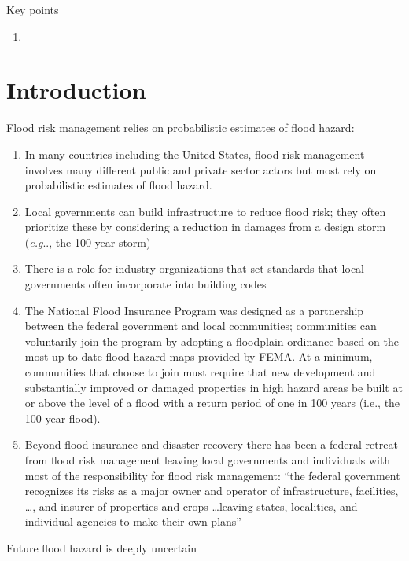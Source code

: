 \documentclass[11pt]{article}
\makeatletter
\DeclareRobustCommand\onedot{\futurelet\@let@token\@onedot}
\def\@onedot{\ifx\@let@token.\else.\null\fi\xspace}
\def\eg{\emph{e.g}\onedot} \def\Eg{\emph{E.g}\onedot}
\DeclareRobustCommand\onedot{\futurelet\@let@token\@onedot}
\def\@onedot{\ifx\@let@token.\else.\null\fi\xspace}
\def\eg{\emph{e.g}\onedot} \def\Eg{\emph{E.g}\onedot}
\makeatother
\begin{document}
Key points
\begin{enumerate}
    \item
\end{enumerate}

\clearpage
\section{Introduction}\label{sec:introduction}

Flood risk management relies on probabilistic estimates of flood hazard:
\begin{enumerate}
    \item In many countries including the United States, flood risk management involves many different public and private sector actors but most rely on probabilistic estimates of flood hazard.
    \item Local governments can build infrastructure to reduce flood risk; they often prioritize these by considering a reduction in damages from a design storm (\eg, the 100 year storm) \citep{hcfcd_prioritization:2019}
    \item There is a role for industry organizations that set standards that local governments often incorporate into building codes \citep{asce_infrastructure_climate:2021}
    \item The National Flood Insurance Program was designed as a partnership between the federal government and local communities; communities can voluntarily join the program by adopting a floodplain ordinance based on the most up-to-date flood hazard maps provided by FEMA. At a minimum, communities that choose to join must require that new development and substantially improved or damaged properties in high hazard areas be built at or above the level of a flood with a return period of one in 100 years (i.e., the 100-year flood). \citep{kousky_voucher:2014}
    \item Beyond flood insurance and disaster recovery there has been a federal retreat from flood risk management leaving local governments and individuals with most of the responsibility for flood risk management: ``the federal government recognizes its risks as a major owner and operator of infrastructure, facilities, \ldots, and insurer of properties and crops \ldots leaving states, localities, and individual agencies to make their own plans'' \citep{shi_transformative:2021}
\end{enumerate}
Future flood hazard is deeply uncertain
\end{document}
